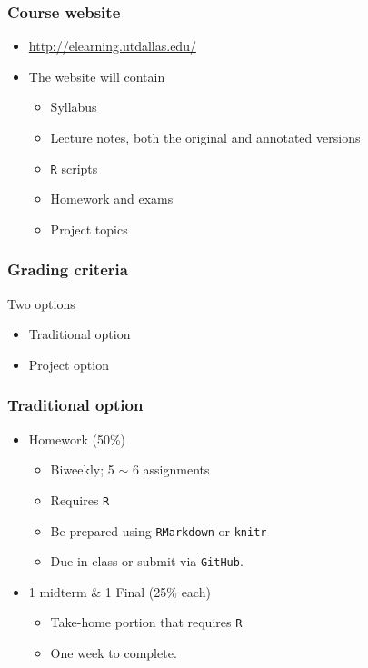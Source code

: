 \documentclass{beamer}
\begin{document}
\begin{frame}
\frametitle{Course website}
\begin{itemize}
\item \url{http://elearning.utdallas.edu/}
\item The website will contain 
\begin{itemize}
\item Syllabus
\item Lecture notes, both the original and annotated versions
\item \texttt{R} scripts
\item Homework and exams
\item Project topics
\end{itemize}
\end{itemize}
\end{frame}

\begin{frame}
\frametitle{Grading criteria}
Two options
\begin{itemize}
\item Traditional option
\item Project option
\end{itemize}
\end{frame}

\begin{frame}
\frametitle{Traditional option}
\begin{itemize}
\item Homework (50\%)
\begin{itemize}
\item Biweekly; 5 $\sim$ 6 assignments
\item Requires \texttt{R}
\item Be prepared using \texttt{RMarkdown} or \texttt{knitr}
\item Due in class or submit via \texttt{GitHub}.
\end{itemize}
\item 1 midterm \& 1 Final (25\% each)
\begin{itemize}
\item Take-home portion that requires \texttt{R}
\item One week to complete.
\end{itemize}
\end{itemize}
\end{frame}
\end{document}
